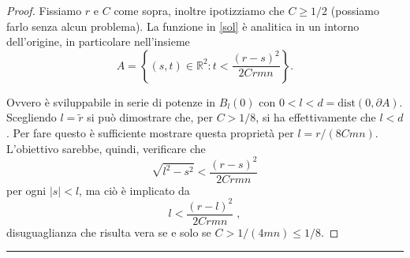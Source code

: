 \begin{proof}
Fissiamo $r$ e $C$ come sopra, inoltre ipotizziamo che $C\geq 1/2$ (possiamo farlo senza alcun problema). 
La funzione in \eqref{sol} è analitica in un intorno dell'origine, in particolare nell'insieme 
$$A = \left\{ (s,t) \in \mathbb{R}^2 : t<\frac{(r-s)^2}{2Crmn} \right\} .$$
\begin{center}
\end{center}

Ovvero è sviluppabile in serie di potenze in $B_l(0)$ con $0<l<d=\text{dist}(0, \partial A)$.
Scegliendo $l = \widetilde{r}$ si può dimostrare che, per $C>1/8$, si ha effettivamente che $l<d$. Per fare questo è sufficiente mostrare questa proprietà per $l=r/(8Cmn)$. L'obiettivo sarebbe, quindi, verificare che $$\sqrt{l^2-s^2} < \frac{(r-s)^2}{2Crmn}$$ per ogni $|s|<l$, ma ciò è implicato da 
$$l < \frac{(r-l)^2}{2Crmn}\; ,$$ disuguaglianza che risulta vera se e solo se $C > 1/(4mn) \leq 1/8$.
\end{proof}

\noindent\rule[0.5ex]{\linewidth}{0.2pt}

